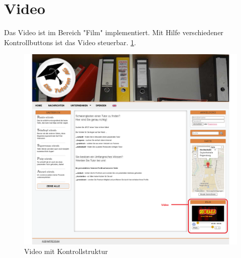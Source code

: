 
\section{Video}

Das Video ist im Bereich "Film" implementiert. Mit Hilfe verschiedener Kontrollbuttons ist das Video steuerbar.
\ref{fig:Video}.

\begin{figure}[!htbp]
 \centering
 \includegraphics[width=1\textwidth]{../Screenshots/Video}
 \caption{Video mit Kontrollstruktur}
 \label{fig:Video}
\end{figure}

